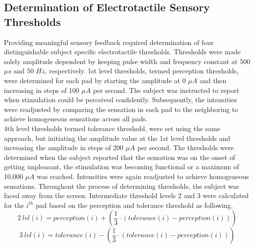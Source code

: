 
\subsection{Determination of Electrotactile Sensory Thresholds}


Providing meaningful sensory feedback required determination of four distinguishable subject specific electrotactile thresholds. Thresholds were made solely amplitude dependent by keeping pulse width and frequency constant at 500 $\mu s$ and 50 $Hz$, respectively. 1st level thresholds, termed perception thresholds, were determined for each pad by starting the amplitude at 0 $\mu A$ and then increasing in steps of 100 $\mu A$ per second. The subject was instructed to report when stimulation could be perceived confidently. Subsequently, the intensities were readjusted by comparing the sensation in each pad to the neighboring to achieve homogeneous sensations across all pads. \\
4th level thresholds termed tolerance threshold, were set using the same approach, but initiating the amplitude value at the 1st level thresholds and increasing the amplitude in steps of 200 $\mu A$ per second. The thresholds were determined when the subject reported that the sensation was on the onset of getting unpleasant, the stimulation was becoming functional or a maximum of 10,000 $\mu A$ was reached. Intensities were again readjusted to achieve homogeneous sensations. Throughout the process of determining thresholds, the subject was faced away from the screen. Intermediate threshold levels 2 and 3 were calculated for the $i^{th}$ pad based on the perception and tolerance threshold as following. 
\vspace{-0.2cm}
{\small 
	\begin{equation}
	2~lvl(i) = perception(i) + (\frac{1}{3} \cdot (tolerance(i) - perception(i)))
	\end{equation}}
{\small
	\begin{equation}
	3~lvl(i) = tolerance(i) - (\frac{1}{3} \cdot (tolerance(i) - perception(i)))
	\end{equation}
}